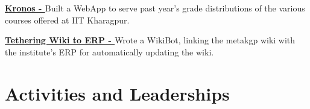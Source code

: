 \documentclass[a4paper,10pt]{extarticle} %
\begin{document}
\textbf{\href{https://github.com/metakgp/kronos}{Kronos - }} Built a WebApp to serve past year's grade distributions of the various courses offered at IIT Kharagpur.

\textbf{\href{https://github.com/metakgp/twerp}{Tethering Wiki to ERP - }} Wrote a WikiBot, linking the metakgp wiki with the institute's ERP for automatically updating the wiki.\\






\section{\textcolor{primary}{Activities and Leaderships}}

\end{document}
